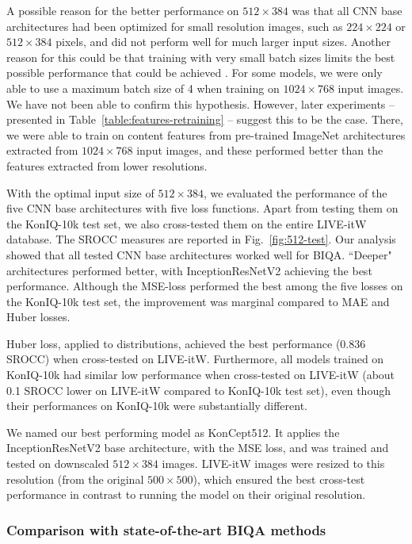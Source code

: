 \documentclass[10pt,journal,compsoc]{IEEEtran}
\begin{document}
A possible reason for the better performance on $512 \times 384$ was that all CNN base architectures had been optimized for small resolution images, such as $224\times 224$ or $512 \times 384$ pixels, and did not perform well for much larger input sizes.  Another reason for this could be that training with very small batch sizes limits the best possible performance that could be achieved \cite{keskar2016large}. For some models, we were only able to use a maximum batch size of 4 when training on $1024 \times 768$ input images. We have not been able to confirm this hypothesis. However, later experiments -- presented in Table~\ref{table:features-retraining} -- suggest this to be the case. There, we were able to train on content features from pre-trained ImageNet architectures extracted from $1024 \times 768$ input images, and these performed better than the features extracted from lower resolutions.

With the optimal input size of $512 \times 384$, we evaluated the performance of the five CNN base architectures with five loss functions. Apart from testing them on the KonIQ-10k test set, we also cross-tested them on the entire LIVE-itW database. The SROCC measures are reported in Fig.~\ref{fig:512-test}.
Our analysis showed that all tested CNN base architectures worked well for BIQA. ``Deeper" architectures performed better, with InceptionResNetV2 achieving the best performance. Although the MSE-loss performed the best among the five losses on the KonIQ-10k test set, the improvement was marginal compared to MAE and Huber losses.

Huber loss, applied to distributions, achieved the best performance (0.836 SROCC) when cross-tested on LIVE-itW. 
Furthermore, all models trained on KonIQ-10k had similar low performance when cross-tested on LIVE-itW (about 0.1 SROCC lower on LIVE-itW compared to KonIQ-10k test set), even though their performances on KonIQ-10k were substantially different.

We named our best performing model as KonCept512. It applies the InceptionResNetV2 base architecture, with the MSE loss, and was trained and tested on downscaled $512\times 384$ images. LIVE-itW images were resized to this resolution (from the original $500\times 500$), which ensured the best cross-test performance in contrast to running the model on their original resolution.

\subsubsection{Comparison with state-of-the-art BIQA methods}
\end{document}
